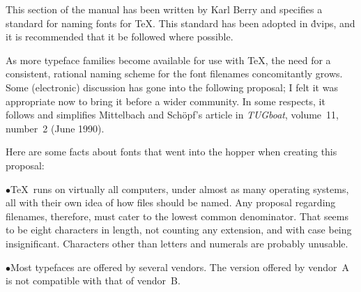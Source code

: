 {\def\journal#1{{\sl #1}}
\def\table{\vbox\bgroup
\vskip\parskip\halign\bgroup\strut\indent\tt ##\hfil\quad
    &\vtop{%
       \advance\hsize by -\parindent %
       \advance\hsize by -1em        %
       \advance\hsize by -2\fontdimen7\tentt
       \rm\noindent ##}\hfil
    \cr}
\def\setuphsize{%
       \advance\hsize by -\parindent %
       \divide\hsize by 2            %
       \advance\hsize by -1.5em      %
       \advance\hsize by -2\fontdimen7\tentt}
\def\dtable{\vbox\bgroup\vskip\parskip\halign\bgroup\strut
    \indent##&\tt ##\hfil\quad
    &\vtop{\setuphsize\rm\noindent ##}\hfil&\quad\tt ##\hfil\quad
    &\vtop{\setuphsize\rm\noindent ##}\hfil\cr}
\def\endtable{%
  \egroup\egroup %
  \smallskip %
}
\def\entry#1#2{#1&#2\cr}
\def\mitem{\item{$\bullet$}}
\def\\{\hfil\break}

This section of the manual has been written by Karl Berry and
specifies a standard for naming fonts for \TeX.  This standard has
been adopted in \.{dvips}, and it is recommended that it be followed
where possible.

As more typeface families become available for use with \TeX, the need
for a consistent, rational naming scheme for the font filenames
concomitantly grows. Some (electronic) discussion has gone into the
following proposal; I felt it was appropriate now to bring it before a
wider community.  In some respects, it follows and simplifies
Mittelbach and Sch\"opf's article in \journal{TUGboat}, volume~11,
number~2 (June 1990).

Here are some facts about fonts that went into the hopper when creating
this proposal:

\mitem \TeX\ runs on virtually all computers, under almost as many operating
systems, all with their own idea of how files should be named.  Any
proposal regarding filenames, therefore, must cater to the lowest common
denominator.  That seems to be eight characters in length, not counting any
extension, and with case being insignificant.  Characters other
than letters and numerals are probably unusable.

\mitem Most typefaces are offered by several vendors.  The version
offered by vendor~A is not compatible with that of vendor~B.

}

